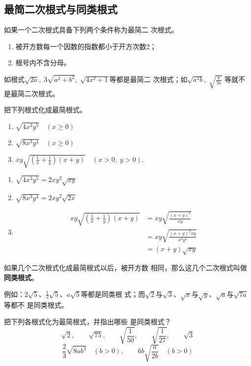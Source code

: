 \subsection{最简二次根式与同类根式}
如果一个二次根式具备下列两个条件称为最简二
次根式。
\begin{enumerate}
    \item 被开方数每一个因数的指数都小于开方次数2；
    \item 根号内不含分母。
\end{enumerate}

如根式$\sqrt{2a},\; 3\sqrt{a^2+b^2},\; \sqrt{4x^2+1}$等都是最简二
次根式；如$\sqrt{a^3b},\; \sqrt{\frac{b}{3a}}$
等就不是最简二次根式。

\begin{example}
    把下列根式化成最简根式。
\begin{enumerate}
    \item $\sqrt{4 x^{3} y^{5}}\quad (x \ge 0)$
    \item  $\sqrt{8 x^{3} y^{4}}\quad (x \ge 0)$
    \item  $x y \sqrt{\left(\frac{1}{x}+\frac{1}{y}\right)(x+y)} \quad(x>0, \; y>0)$.
\end{enumerate}
\end{example}

\begin{solution}
\begin{enumerate}
    \item $\sqrt{4 x^{3} y^{5}}=2 x y^{2} \sqrt{x y}$
    \item $\sqrt{8 x^{3} y^{4}}=2 x y^{2} \sqrt{2 x}$
    \item \[\begin{split}
    x y \sqrt{\left(\frac{1}{x}+\frac{1}{y}\right)(x+y)}
&=x y \sqrt{\frac{(x+y)^{2}}{x y}}\\
&={x} y \sqrt{\frac{(x+y)^{2} x y}{x^{2} y^{2}}}\\
&=(x+y) \sqrt{x y}
\end{split}\]
\end{enumerate}
    
\end{solution}

如果几个二次根式化成最简根式以后，被开方数
相同，那么这几个二次根式叫做\textbf{同类根式}。

例如：$2\sqrt{5}$、$\frac{1}{3}\sqrt{5}$、$a\sqrt{5}$等都是同类根
式；而$\sqrt{2}$与$\sqrt{3}$、$\sqrt{x}$与$\sqrt{y}$、$\sqrt{a}$与$\sqrt{7a}$等都不
是同类根式。

\begin{example}
    把下列各根式化为最简根式，并指出哪些
是同类根式？
\[\sqrt{2},\qquad \sqrt{75},\qquad \sqrt{\frac{1}{50}},\qquad \sqrt{\frac{1}{27}},\qquad \sqrt{3}\]
\[\frac{2}{3}\sqrt{8ab^3}\quad (b>0),\qquad 6b\sqrt{\frac{a}{2b}}\quad (b>0)\]
\end{example}


